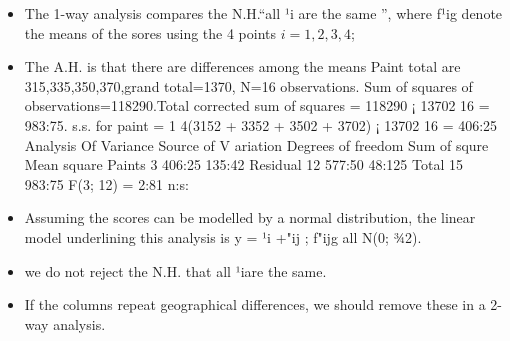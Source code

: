 \documentclass[a4paper,12pt]{article}
\begin{document}
\begin{itemize}
    \item The 1-way analysis compares the N.H.“all ¹i are the same ”, where f¹ig denote
the means of the sores using the 4 points $i=1,2,3,4$; 

\item The A.H. is that there are differences
among the means
Paint total are 315,335,350,370,grand total=1370, N=16 observations. Sum of squares
of observations=118290.Total corrected sum of squares = 118290 ¡ 13702
16 = 983:75. s.s.
for paint = 1
4(3152 + 3352 + 3502 + 3702) ¡ 13702
16 = 406:25
Analysis Of Variance
Source of V ariation Degrees of freedom Sum of squre Mean square
Paints 3 406:25 135:42
Residual 12 577:50 48:125
Total 15 983:75
F(3; 12) = 2:81 n:s:
\item 
Assuming the scores can be modelled by a normal distribution, the linear model underlining
this analysis is y = ¹i +"ij ; f"ijg all N(0; ¾2). 
\item we do not reject the N.H. that all
¹iare the same.
\item If the columns repeat geographical differences, we should remove these in a 2-way analysis.
\end{itemize}


\end{document}

